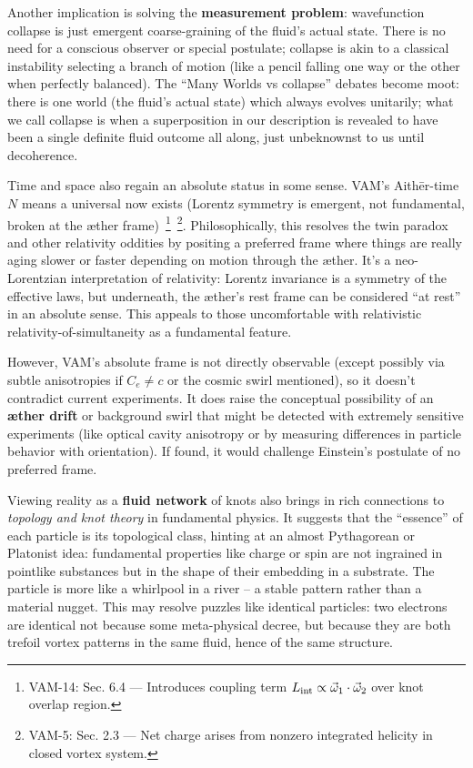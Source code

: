 \documentclass[a4paper,12pt]{article}
\begin{document}
    Another implication is solving the \textbf{measurement problem}: wavefunction collapse is just emergent coarse-graining of the fluid’s actual state. There is no need for a conscious observer or special postulate; collapse is akin to a classical instability selecting a branch of motion (like a pencil falling one way or the other when perfectly balanced). The “Many Worlds vs collapse” debates become moot: there is one world (the fluid’s actual state) which always evolves unitarily; what we call collapse is when a superposition in our description is revealed to have been a single definite fluid outcome all along, just unbeknownst to us until decoherence.

    Time and space also regain an absolute status in some sense. VAM’s Aithēr-time $N$ means a universal now exists (Lorentz symmetry is emergent, not fundamental, broken at the æther frame)~\footnote{VAM-14: Sec. 6.4 — Introduces coupling term $L_{\rm int} \propto \vec{\omega}_1 \cdot \vec{\omega}_2$ over knot overlap region.}~\footnote{VAM-5: Sec. 2.3 — Net charge arises from nonzero integrated helicity in closed vortex system.}. Philosophically, this resolves the twin paradox and other relativity oddities by positing a preferred frame where things are really aging slower or faster depending on motion through the æther. It’s a neo-Lorentzian interpretation of relativity: Lorentz invariance is a symmetry of the effective laws, but underneath, the æther’s rest frame can be considered “at rest” in an absolute sense. This appeals to those uncomfortable with relativistic relativity-of-simultaneity as a fundamental feature.

    However, VAM’s absolute frame is not directly observable (except possibly via subtle anisotropies if $C_e \neq c$ or the cosmic swirl mentioned), so it doesn’t contradict current experiments. It does raise the conceptual possibility of an \textbf{æther drift} or background swirl that might be detected with extremely sensitive experiments (like optical cavity anisotropy or by measuring differences in particle behavior with orientation). If found, it would challenge Einstein’s postulate of no preferred frame.

    Viewing reality as a \textbf{fluid network} of knots also brings in rich connections to \emph{topology and knot theory} in fundamental physics. It suggests that the “essence” of each particle is its topological class, hinting at an almost Pythagorean or Platonist idea: fundamental properties like charge or spin are not ingrained in pointlike substances but in the shape of their embedding in a substrate. The particle is more like a whirlpool in a river – a stable pattern rather than a material nugget. This may resolve puzzles like identical particles: two electrons are identical not because some meta-physical decree, but because they are both trefoil vortex patterns in the same fluid, hence of the same structure.
\end{document}
